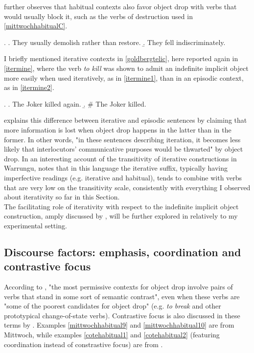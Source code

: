 \textcite[250]{Mittwoch2005} further observes that habitual contexts also favor object drop with verbs that would usually block it, such as the verbs of destruction used in \ref{mittwochhabitualC}.

\ex. \label{mittwochhabitualC} \a. \label{mittwochhabitual6} They usually demolish rather than restore.
\b. \label{mittwochhabitual7} They fell indiscriminately.

I briefly mentioned iterative contexts in \ref{goldbergtelic}, here reported again in \ref{itermine}, where the verb \textit{to kill} was shown to admit an indefinite implicit object more easily when used iteratively, as in \ref{itermine1}, than in an episodic context, as in \ref{itermine2}.

\ex. \label{itermine} \a. \label{itermine1} The Joker killed again.
\b. \label{itermine2} \# The Joker killed.

\textcite[5]{Glass2013} explains this difference between iterative and episodic sentences by claiming that more information is lost when object drop happens in the latter than in the former. In other words, "in these sentences describing iteration, it becomes less likely that interlocutors' communicative purposes would be thwarted" by object drop. In an interesting account of the transitivity of iterative constructions in Warrungu, \textcite[4-5]{Tsunoda1999} notes that in this language the iterative suffix, typically having imperfective readings (e.g. iterative and habitual), tends to combine with verbs that are very low on the transitivity scale, consistently with everything I observed about iterativity so far in this Section.\\
The facilitating role of iterativity with respect to the indefinite implicit object construction, amply discussed by \textcite{Goldberg2001}, will be further explored in  relatively to my experimental setting.


\subsection{Discourse factors: emphasis, coordination and contrastive focus} 

According to \textcite[251-252]{Mittwoch2005}, "the most permissive contexts for object drop involve pairs of verbs that stand in some sort of semantic contrast", even when these verbs are "some of the poorest candidates for object drop" (e.g. \textit{to break} and other prototypical change-of-state verbs). Contrastive focus is also discussed in these terms by \textcite{Dixon1992}. Examples \ref{mittwochhabitual9} and \ref{mittwochhabitual10} are from Mittwoch, while examples \ref{cotehabitual1} and \ref{cotehabitual2} (featuring coordination instead of constrastive focus) are from \textcite[112, 143]{Cote1996}.

